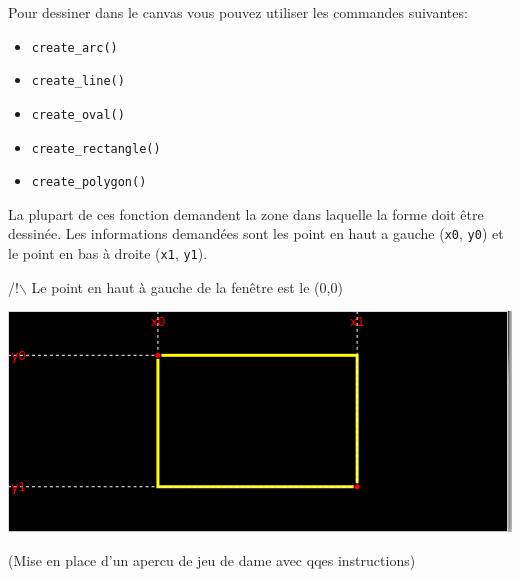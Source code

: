 \documentclass{article}
\begin{document}
Pour dessiner dans le canvas vous pouvez utiliser les commandes suivantes:
\begin{itemize}
\item \verb~create_arc()~
\item \verb~create_line()~
\item \verb~create_oval()~
\item \verb~create_rectangle()~
\item \verb~create_polygon()~
\end{itemize}

La plupart de ces fonction demandent la zone dans laquelle la forme doit être dessinée. Les informations demandées sont les point en haut a gauche (\verb~x0~, \verb~y0~) et le point en bas à droite (\verb~x1~, \verb~y1~).

\noindent
/!$\backslash$ Le point en haut à gauche de la fenêtre est le (0,0)


\includegraphics[width=.9\linewidth]{./img/coord_canvas.png}

(Mise en place d'un apercu de jeu de dame avec qqes instructions)
\end{document}
